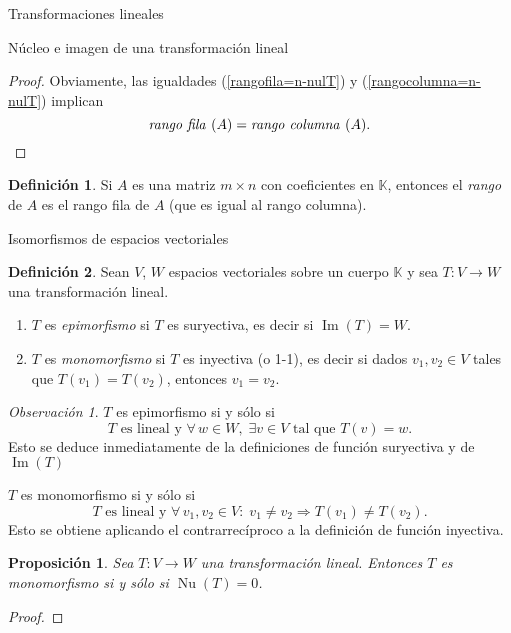 \documentclass[a4paper,12pt,twoside,spanish,reqno]{amsbook}
\newtheorem{proposicion}[teorema]{Proposici\'on}
\theoremstyle{definition}
\newtheorem{definicion}{Definici\'on}[section]
\theoremstyle{remark}
\newtheorem{obs}{Observaci\'on}[section]
\newcommand{\img}{\operatorname{Im}}
\newcommand{\nuc}{\operatorname{Nu}}
\newcommand{\K}{\mathbb K}
\begin{document}
\begin{chapter}{Transformaciones lineales}
\begin{section}{Núcleo e imagen de una transformación lineal}
\begin{proof}
            Obviamente, las igualdades (\ref{rangofila=n-nulT}) y (\ref{rangocolumna=n-nulT}) implican 
            $$
        \text{\textit{rango fila }} (A) = \text{\textit{rango  columna }} (A).
        $$
        \end{proof}
    
        \begin{definicion}
                Si $A$ es una matriz $m \times n$ con coeficientes  en $\K$,  entonces el \textit{rango} de $A$ es el rango fila de $A$ (que es igual al rango columna).
        \end{definicion}
        
        \end{section}
    
        \begin{section}{Isomorfismos de espacios vectoriales}
        
        \begin{definicion}
            Sean $V$, $W$ espacios vectoriales sobre un cuerpo $\K$ y sea $T:V \to W$ una transformación lineal.
            \begin{enumerate}
                \item $T$  es \textit{epimorfismo} si $T$ es suryectiva, es decir si $\img(T) = W$.
                \item $T$ es \textit{monomorfismo} si $T$ es inyectiva (o 1-1),  es decir si dados $v_1,v_2 \in V$ tales que $T(v_1) = T(v_2)$,  entonces $v_1 = v_2$.
            \end{enumerate}  
        \end{definicion}
    
        \begin{obs}
            $T$  es epimorfismo si y sólo si 
            $$
            \text{$T$ es lineal y }\forall\, w \in W, \; \exists v \in V \text{ tal que }T(v)=w.
            $$
            Esto se deduce inmediatamente de la definiciones de función suryectiva y de $\img(T)$
            
            $T$ es monomorfismo si y sólo si 
            $$
                \text{$T$ es lineal y }\forall\, v_1,v_2  \in V: \; v_1 \ne v_2 \Rightarrow T(v_1) \not= T(v_2).
            $$ 
            Esto se obtiene aplicando el contrarrecíproco a la definición de función inyectiva.
        \end{obs}	
        
        
            
        \begin{proposicion}\label{inyectiva-sii-nuT=0}
            Sea $T:V \to W$ una transformación lineal. Entonces $T$ es monomorfismo si y sólo si $\nuc(T) =0$.
        \end{proposicion}	
        \begin{proof} 
            

\end{proof}
\end{section}
\end{chapter}
\end{document}
